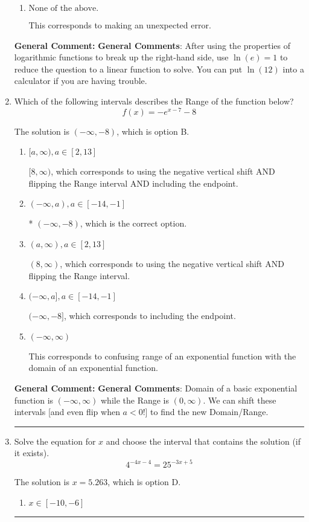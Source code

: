 \documentclass{extbook}[14pt]
\newcommand{\litem}[1]{\item #1

\rule{\textwidth}{0.4pt}}
\begin{document}
\begin{enumerate}
{\begin{enumerate}[label=\Alph*.]
This corresponds to believing you cannot solve the equation.
\item \( \text{None of the above.} \)

This corresponds to making an unexpected error.
\end{enumerate}

\textbf{General Comment:} \textbf{General Comments}: After using the properties of logarithmic functions to break up the right-hand side, use $\ln(e) = 1$ to reduce the question to a linear function to solve. You can put $\ln(12)$ into a calculator if you are having trouble.
}
\litem{
Which of the following intervals describes the Range of the function below?
\[ f(x) = -e^{x-7}-8 \]

The solution is \( (-\infty, -8) \), which is option B.\begin{enumerate}[label=\Alph*.]
\item \( [a, \infty), a \in [2, 13] \)

$[8, \infty)$, which corresponds to using the negative vertical shift AND flipping the Range interval AND including the endpoint.
\item \( (-\infty, a), a \in [-14, -1] \)

* $(-\infty, -8)$, which is the correct option.
\item \( (a, \infty), a \in [2, 13] \)

$(8, \infty)$, which corresponds to using the negative vertical shift AND flipping the Range interval.
\item \( (-\infty, a], a \in [-14, -1] \)

$(-\infty, -8]$, which corresponds to including the endpoint.
\item \( (-\infty, \infty) \)

This corresponds to confusing range of an exponential function with the domain of an exponential function.
\end{enumerate}

\textbf{General Comment:} \textbf{General Comments}: Domain of a basic exponential function is $(-\infty, \infty)$ while the Range is $(0, \infty)$. We can shift these intervals [and even flip when $a<0$!] to find the new Domain/Range.
}
\litem{
Solve the equation for $x$ and choose the interval that contains the solution (if it exists).
\[ 4^{-4x-4} = 25^{-3x+5} \]

The solution is \( x = 5.263 \), which is option D.\begin{enumerate}[label=\Alph*.]
\item \( x \in [-10, -6] \)


\end{enumerate}}
\end{enumerate}
\end{document}
